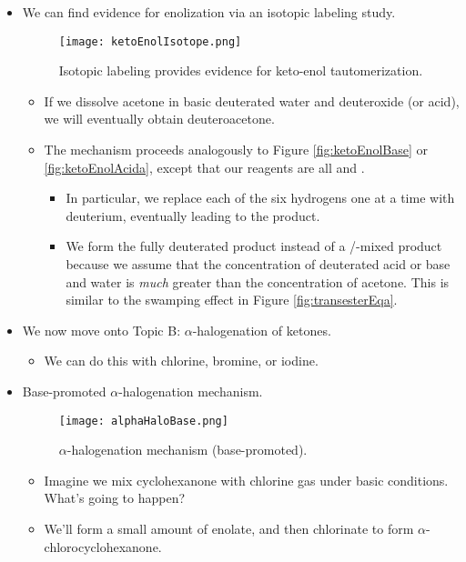 \documentclass[../notes.tex]{subfiles}
\begin{document}
\begin{itemize}
    \pagebreak
    \item We can find evidence for enolization via an isotopic labeling study.
    \begin{figure}[h!]
        \centering
        \texttt{[image: ketoEnolIsotope.png]}
        \caption{Isotopic labeling provides evidence for keto-enol tautomerization.}
        \label{fig:ketoEnolIsotope}
    \end{figure}
    \begin{itemize}
        \item If we dissolve acetone in basic deuterated water and deuteroxide (or acid), we will eventually obtain deuteroacetone.
        \item The mechanism proceeds analogously to Figure \ref{fig:ketoEnolBase} or \ref{fig:ketoEnolAcida}, except that our reagents are all  and .
        \begin{itemize}
            \item In particular, we replace each of the six hydrogens one at a time with deuterium, eventually leading to the product.
            \item We form the fully deuterated product instead of a /-mixed product because we assume that the concentration of deuterated acid or base and water is \emph{much} greater than the concentration of acetone. This is similar to the swamping effect in Figure \ref{fig:transesterEqa}.
        \end{itemize}
    \end{itemize}
    \item We now move onto Topic B: $\alpha$-halogenation of ketones.
    \begin{itemize}
        \item We can do this with chlorine, bromine, or iodine.
    \end{itemize}
    \item Base-promoted $\alpha$-halogenation mechanism.
    \begin{figure}[h!]
        \centering
        \texttt{[image: alphaHaloBase.png]}
        \caption{$\alpha$-halogenation mechanism (base-promoted).}
        \label{fig:alphaHaloBase}
    \end{figure}
    \begin{itemize}
        \item Imagine we mix cyclohexanone with chlorine gas under basic conditions. What's going to happen?
        \item We'll form a small amount of enolate, and then chlorinate to form $\alpha$-chlorocyclohexanone.

\end{itemize}
\end{itemize}
\end{document}
